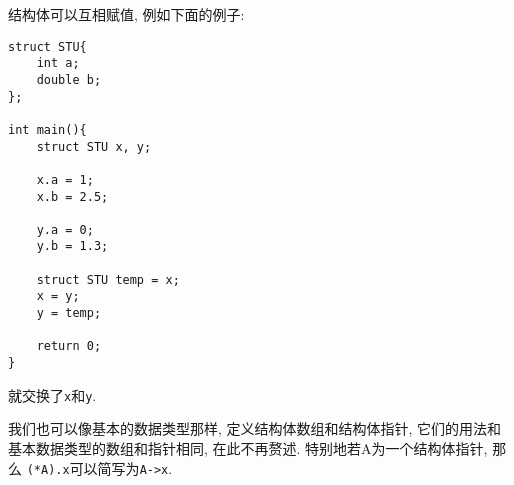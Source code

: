     结构体可以互相赋值, 例如下面的例子:
\begin{lstlisting}
struct STU{
    int a;
    double b;
};

int main(){
    struct STU x, y;

    x.a = 1;
    x.b = 2.5;

    y.a = 0;
    y.b = 1.3;
    
    struct STU temp = x;
    x = y;
    y = temp;

    return 0;
}
\end{lstlisting}
    就交换了\texttt{x}和\texttt{y}.

    我们也可以像基本的数据类型那样, 定义结构体数组和结构体指针, 它们的用法和基本数据类型的数组和指针相同, 在此不再赘述. 特别地若A为一个结构体指针, 那么
    \texttt{(*A).x}可以简写为\texttt{A->x}.

